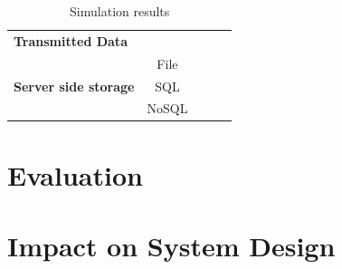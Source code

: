 \begin{table}[h]
\begin{tabular}{l|c|c|c|c}
\multirow{2}{*}{\textbf{Transmitted Data}}               & \cellcolor{green}                                                           & \cellcolor{green}                                       & \cellcolor{green}                                                 & \cellcolor{red}                                       \\ \cline{2-5} 
                                                         & \cellcolor{red}                                                           & \cellcolor{red}                                       & \cellcolor{red}                                                 & \cellcolor{green}                                       \\ \hline
\multirow{3}{*}{\textbf{Server side storage}}            & File                                                        &\cellcolor{yellow}                                      & \cellcolor{purple}                                                 &\cellcolor{yellow}                                      \\ \cline{2-5} 
                                                         & SQL                                                         &\cellcolor{yellow}                                      & \cellcolor{purple}                                                 &\cellcolor{yellow}                                      \\ \cline{2-5} 
                                                         & NoSQL                                                       &\cellcolor{yellow}                                      & \cellcolor{purple}                                                 &\cellcolor{yellow}                                      \\ \hline
\end{tabular}
\caption{Simulation results}
\label{tab:SimulationResults}
\end{table}

\section{Evaluation}

\section{Impact on System Design}
